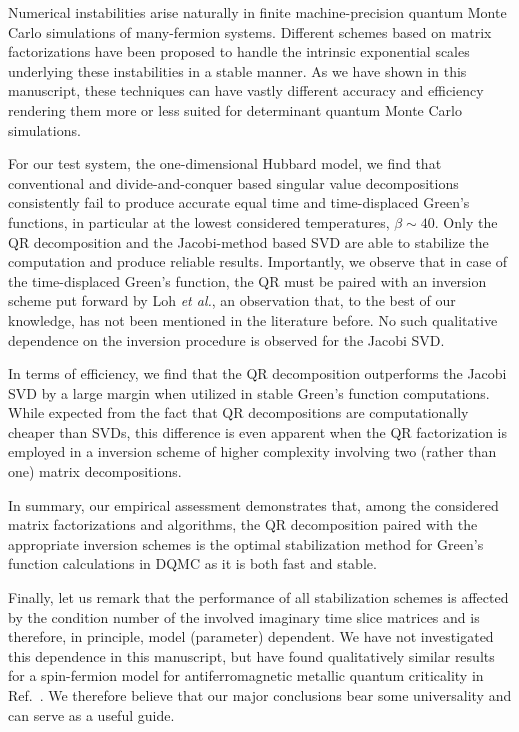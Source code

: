 \documentclass[submission, Phys]{SciPost}
\begin{document}
Numerical instabilities arise naturally in finite machine-precision quantum Monte Carlo simulations of many-fermion systems. Different schemes based on matrix factorizations have been proposed to handle the intrinsic exponential scales underlying these instabilities in a stable manner. As we have shown in this manuscript, these techniques can have vastly different accuracy and efficiency rendering them more or less suited for determinant quantum Monte Carlo simulations.

For our test system, the one-dimensional Hubbard model, we find that conventional and divide-and-conquer based singular value decompositions consistently fail to produce accurate equal time and time-displaced Green's functions, in particular at the lowest considered temperatures, $\beta \sim 40$. Only the QR decomposition and the Jacobi-method based SVD are able to stabilize the computation and produce reliable results. Importantly, we observe that in case of the time-displaced Green's function, the QR must be paired with an inversion scheme put forward by Loh \textit{et al.}\cite{Loh1989}, an observation that, to the best of our knowledge, has not been mentioned in the literature before. No such qualitative dependence on the inversion procedure is observed for the Jacobi SVD.

In terms of efficiency, we find that the QR decomposition outperforms the Jacobi SVD by a large margin when utilized in stable Green's function computations. While expected from the fact that QR decompositions are computationally cheaper than SVDs, this difference is even apparent when the QR factorization is employed in a inversion scheme of higher complexity involving two (rather than one) matrix decompositions.

In summary, our empirical assessment demonstrates that, among the considered matrix factorizations and algorithms, the QR decomposition paired with the appropriate inversion schemes is the optimal stabilization method for Green's function calculations in DQMC as it is both fast and stable.

Finally, let us remark that the performance of all stabilization schemes is affected by the condition number of the involved imaginary time slice matrices and is therefore, in principle, model (parameter) dependent. We have not investigated this dependence in this manuscript, but have found qualitatively similar results for a spin-fermion model for antiferromagnetic metallic quantum criticality in Ref.~\cite{Bauer2020}. We therefore believe that our major conclusions bear some universality and can serve as a useful guide.
\end{document}
